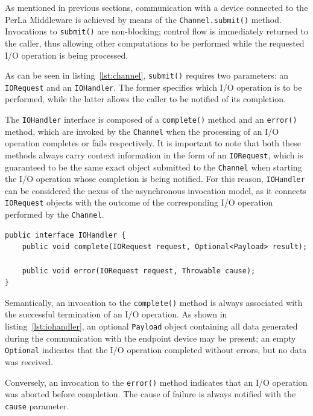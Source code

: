 As mentioned in previous sections, communication with a device connected to the PerLa Middleware is achieved by means of the \texttt{Channel.submit()} method. Invocations to \texttt{submit()} are non-blocking; control flow is immediately returned to the caller, thus allowing other computations to be performed while the requested I/O operation is being processed. 

As can be seen in listing~\ref{lst:channel}, \texttt{submit()} requires two parameters: an \texttt{IORequest} and an \texttt{IOHandler}. The former specifies which I/O operation is to be performed, while the latter allows the caller to be notified of its completion.

The \texttt{IOHandler} interface is composed of a \texttt{complete()} method and an \texttt{error()} method, which are invoked by the \texttt{Channel} when the processing of an I/O operation completes or fails respectively. It is important to note that both these methods always carry context information in the form of an \texttt{IORequest}, which is guaranteed to be the same exact object submitted to the \texttt{Channel} when starting the I/O operation whose completion is being notified. For this reason, \texttt{IOHandler} can be considered the nexus of the asynchronous invocation model, as it connects \texttt{IORequest} objects with the outcome of the corresponding I/O operation performed by the \texttt{Channel}.

\lstset{language=Java}
\begin{lstlisting}[float,floatplacement=H,caption=The IOHandler interface,label={lst:iohandler}]
public interface IOHandler {
	public void complete(IORequest request, Optional<Payload> result);
	
	public void error(IORequest request, Throwable cause);
}
\end{lstlisting}

Semantically, an invocation to the \texttt{complete()} method is always associated with the successful termination of an I/O operation. As shown in listing~\ref{lst:iohandler}, an optional \texttt{Payload} object containing all data generated during the communication with the endpoint device may be present; an empty \texttt{Optional} indicates that the I/O operation completed without errors, but no data was received.

Conversely, an invocation to the \texttt{error()} method indicates that an I/O operation was aborted before completion. The cause of failure is always notified with the \texttt{cause} parameter.


